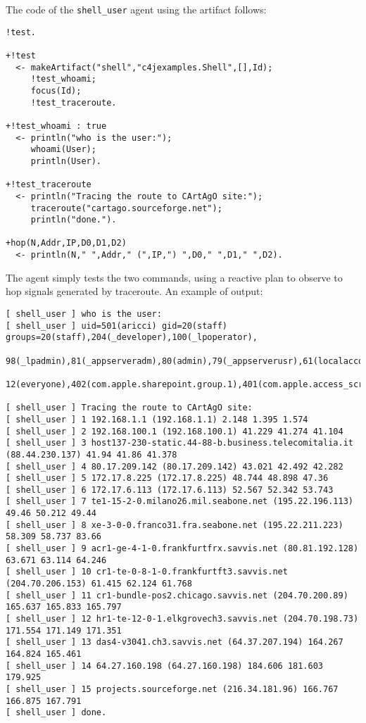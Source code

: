 \documentclass[11pt]{report}
\newcommand\code[1]{{\small{\mbox{\texttt{{#1}}}}}}
\begin{document}
%
\noindent The code of the \code{shell\_user} agent using the artifact follows:
%
{\small{\begin{verbatim}
!test.

+!test
  <- makeArtifact("shell","c4jexamples.Shell",[],Id);
     !test_whoami;
     focus(Id);
     !test_traceroute.
   
+!test_whoami : true
  <- println("who is the user:");
     whoami(User);
     println(User).
   
+!test_traceroute 
  <- println("Tracing the route to CArtAgO site:");
     traceroute("cartago.sourceforge.net");
     println("done.").
  
+hop(N,Addr,IP,D0,D1,D2)
  <- println(N," ",Addr," (",IP,") ",D0," ",D1," ",D2).
\end{verbatim}}}

%
\noindent The agent simply tests the two commands, using a reactive plan to observe to hop signals generated by traceroute.
%
An example of output:
\begin{scriptsize}
\begin{verbatim}
[ shell_user ] who is the user:
[ shell_user ] uid=501(aricci) gid=20(staff) groups=20(staff),204(_developer),100(_lpoperator),
                        98(_lpadmin),81(_appserveradm),80(admin),79(_appserverusr),61(localaccounts),
                        12(everyone),402(com.apple.sharepoint.group.1),401(com.apple.access_screensharing)

[ shell_user ] Tracing the route to CArtAgO site:
[ shell_user ] 1 192.168.1.1 (192.168.1.1) 2.148 1.395 1.574
[ shell_user ] 2 192.168.100.1 (192.168.100.1) 41.229 41.274 41.104
[ shell_user ] 3 host137-230-static.44-88-b.business.telecomitalia.it (88.44.230.137) 41.94 41.86 41.378
[ shell_user ] 4 80.17.209.142 (80.17.209.142) 43.021 42.492 42.282
[ shell_user ] 5 172.17.8.225 (172.17.8.225) 48.744 48.898 47.36
[ shell_user ] 6 172.17.6.113 (172.17.6.113) 52.567 52.342 53.743
[ shell_user ] 7 te1-15-2-0.milano26.mil.seabone.net (195.22.196.113) 49.46 50.212 49.44
[ shell_user ] 8 xe-3-0-0.franco31.fra.seabone.net (195.22.211.223) 58.309 58.737 83.66
[ shell_user ] 9 acr1-ge-4-1-0.frankfurtfrx.savvis.net (80.81.192.128) 63.671 63.114 64.246
[ shell_user ] 10 cr1-te-0-8-1-0.frankfurtft3.savvis.net (204.70.206.153) 61.415 62.124 61.768
[ shell_user ] 11 cr1-bundle-pos2.chicago.savvis.net (204.70.200.89) 165.637 165.833 165.797
[ shell_user ] 12 hr1-te-12-0-1.elkgrovech3.savvis.net (204.70.198.73) 171.554 171.149 171.351
[ shell_user ] 13 das4-v3041.ch3.savvis.net (64.37.207.194) 164.267 164.824 165.461
[ shell_user ] 14 64.27.160.198 (64.27.160.198) 184.606 181.603 179.925
[ shell_user ] 15 projects.sourceforge.net (216.34.181.96) 166.767 166.875 167.791
[ shell_user ] done.
\end{verbatim}
\end{scriptsize}
\end{document}
